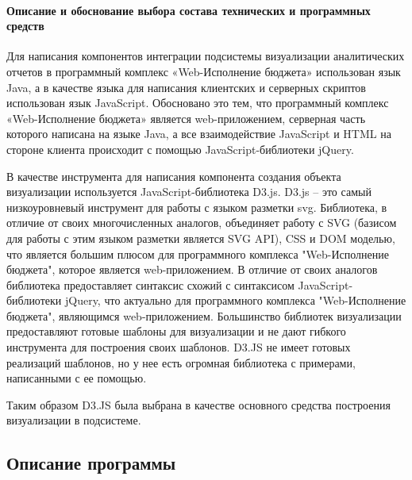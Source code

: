 \documentclass[a4paper]{extarticle}
\begin{document}
\paragraph{Описание и обоснование выбора состава технических и программных средств}
Для написания компонентов интеграции подсистемы визуализации аналитических отчетов в программный комплекс «Web-Исполнение бюджета» использован язык Java, а в качестве языка для написания клиентских и серверных скриптов использован язык JavaScript. Обосновано это тем, что программный комплекс «Web-Исполнение бюджета» является web-приложением, серверная часть которого написана на языке Java, а все взаимодействие JavaScript и HTML на стороне клиента происходит с помощью JavaScript-библиотеки jQuery.\par
В качестве инструмента для написания компонента создания объекта визуализации используется JavaScript-библиотека D3.js. D3.js – это самый низкоуровневый инструмент для работы с языком разметки svg. Библиотека, в отличие от своих многочисленных аналогов, объединяет работу с SVG (базисом для работы с этим языком разметки является SVG API), CSS и DOM моделью, что является большим плюсом для программного комплекса "Web-Исполнение бюджета", которое является web-приложением. В отличие от своих аналогов библиотека предоставляет синтаксис схожий с синтаксисом JavaScript-библиотеки jQuery, что актуально для программного комплекса "Web-Исполнение бюджета", являющимся web-приложением. Большинство библиотек визуализации предоставляют готовые шаблоны для визуализации и не дают гибкого инструмента для построения своих шаблонов. D3.JS не имеет готовых реализаций шаблонов, но у нее есть огромная библиотека с примерами, написанными с ее помощью.\par
Таким образом D3.JS была выбрана в качестве основного средства построения визуализации в подсистеме.

\subsection{Описание программы}
\end{document}
